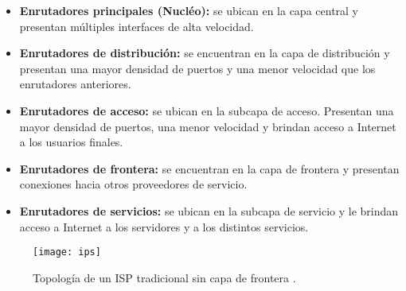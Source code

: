 \begin{itemize}
\item \textbf{Enrutadores principales (Nucléo):} se ubican en la capa central y presentan
  múltiples interfaces de alta velocidad.
\item \textbf {Enrutadores de distribución:} se encuentran en la capa de
  distribución y presentan una mayor densidad de puertos y una menor velocidad
  que los enrutadores anteriores.
\item \textbf {Enrutadores de acceso:} se ubican en la subcapa de acceso. Presentan 
una mayor densidad de puertos, una menor velocidad y brindan acceso a Internet a los
usuarios finales.
\item \textbf {Enrutadores de frontera:} se encuentran en la capa de frontera y
  presentan conexiones hacia otros proveedores de servicio.
\item \textbf {Enrutadores de servicios:} se ubican en la subcapa de servicio y le 
brindan acceso a Internet a los servidores y a los distintos servicios.
\end{itemize}


\begin{figure}[H]
	\centering 
	\texttt{[image: ips]}
	\caption[Topología de un ISP tradicional sin capa de frontera]{Topología de un ISP tradicional sin capa de frontera \parencite{isp_cisco}.}
	\label{fig:ISP}
\end{figure}